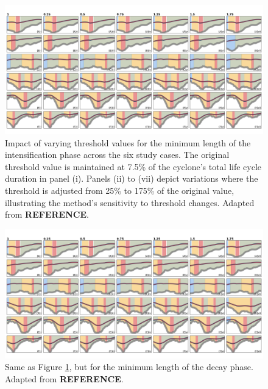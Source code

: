 \begin{figure}[h!]
    \centering
    \includegraphics[width=\textwidth]{figs_3/figure_threshold_intensification_length.png}
    \caption[Impact of Varying Threshold Values for Intensification Phase]{Impact of varying threshold values for the minimum length of the intensification phase across the six study cases. The original threshold value is maintained at 7.5\% of the cyclone's total life cycle duration in panel (i). Panels (ii) to (vii) depict variations where the threshold is adjusted from 25\% to 175\% of the original value, illustrating the method's sensitivity to threshold changes. Adapted from \textbf{REFERENCE}.}
    \label{fig:threshold_intensification}
\end{figure}

\begin{figure}[h!]
    \centering
    \includegraphics[width=\textwidth]{figs_3/figure_threshold_decay_length.png}
    \caption[Impact of Varying Threshold Values for Decay Phase]{Same as Figure \ref{fig:threshold_intensification}, but for the minimum length of the decay phase. Adapted from \textbf{REFERENCE}.}
    \label{fig:threshold_decay}
\end{figure}

